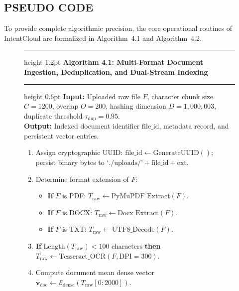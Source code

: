 \documentclass[a4paper,12pt]{article}
\begin{document}
\vspace{0.4em}
\subsection{PSEUDO CODE}

To provide complete algorithmic precision, the core operational routines of IntentCloud are formalized in Algorithm~4.1 and Algorithm~4.2.


\vspace{0.4em}
\begin{figure}[H]
\centering
\begin{minipage}{0.98\textwidth}
\hrule height 1.2pt
\vspace{0.3em}
\noindent\textbf{Algorithm 4.1: Multi-Format Document Ingestion, Deduplication, and Dual-Stream Indexing}
\vspace{0.3em}
\hrule height 0.6pt
\vspace{0.4em}
\small
\textbf{Input:} Uploaded raw file $F$, character chunk size $C=1200$, overlap $O=200$, hashing dimension $D=1,000,003$, duplicate threshold $\tau_{\text{dup}}=0.95$.\\
\textbf{Output:} Indexed document identifier $\text{file\_id}$, metadata record, and persistent vector entries.\\[0.4em]
\begin{enumerate}
    \setlength{\itemsep}{1.5pt}
    \setlength{\parskip}{0pt}
    \item Assign cryptographic UUID: $\text{file\_id} \leftarrow \text{GenerateUUID}()$; persist binary bytes to $\text{`./uploads/'} + \text{file\_id} + \text{ext}$.
    \item Determine format extension of $F$:
    \begin{itemize}
        \item \textbf{If} $F$ is PDF: $T_{\text{raw}} \leftarrow \text{PyMuPDF\_Extract}(F)$.
        \item \textbf{If} $F$ is DOCX: $T_{\text{raw}} \leftarrow \text{Docx\_Extract}(F)$.
        \item \textbf{If} $F$ is TXT: $T_{\text{raw}} \leftarrow \text{UTF8\_Decode}(F)$.
    \end{itemize}
    \item \textbf{If} $\text{Length}(T_{\text{raw}}) < 100$ characters \textbf{then} $T_{\text{raw}} \leftarrow \text{Tesseract\_OCR}(F, \text{DPI}=300)$.
    \item Compute document mean dense vector $\mathbf{v}_{\text{doc}} \leftarrow \mathcal{E}_{\text{dense}}(T_{\text{raw}}[0:2000])$.

\end{enumerate}
\end{minipage}
\end{figure}
\end{document}
